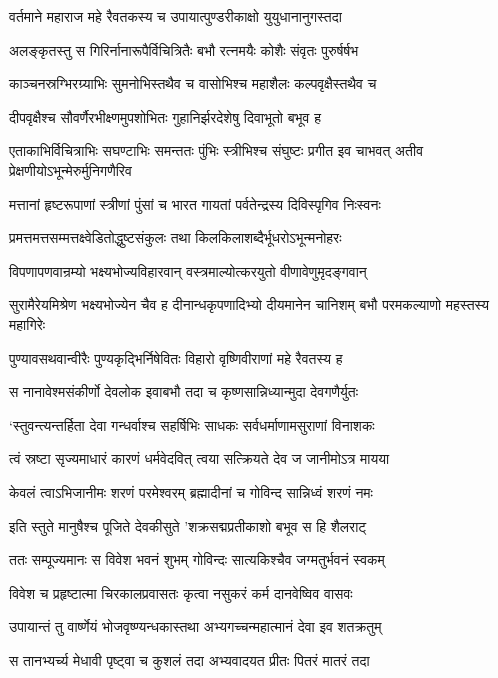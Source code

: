 \twolineshloka
{वर्तमाने महाराज महे रैवतकस्य च}
{उपायात्पुण्डरीकाक्षो युयुधानानुगस्तदा}


\twolineshloka
{अलङ्कृतस्तु स गिरिर्नानारूपैर्विचित्रितैः}
{बभौ रत्नमयैः कोशैः संवृतः पुरुर्षर्षभ}


\twolineshloka
{काञ्चनस्रग्भिरग्र्याभिः सुमनोभिस्तथैव च}
{वासोभिश्च महाशैलः कल्पवृक्षैस्तथैव च}


\twolineshloka
{दीपवृक्षैश्च सौवर्णैरभीक्ष्णमुपशोभितः}
{गुहानिर्झरदेशेषु दिवाभूतो बभूव ह}


\threelineshloka
{एताकाभिर्विचित्राभिः सघण्टाभिः समन्ततः}
{पुंभिः स्त्रीभिश्च संघुष्टः प्रगीत इव चाभवत्}
{अतीव प्रेक्षणीयोऽभून्मेरुर्मुनिगणैरिव}


\twolineshloka
{मत्तानां हृष्टरूपाणां स्त्रीणां पुंसां च भारत}
{गायतां पर्वतेन्द्रस्य दिविस्पृगिव निःस्वनः}


\twolineshloka
{प्रमत्तमत्तसम्मत्तक्ष्वेडितोद्धुष्टसंकुलः}
{तथा किलकिलाशब्दैर्भूधरोऽभून्मनोहरः}


\twolineshloka
{विपणापणवान्रम्यो भक्ष्यभोज्यविहारवान्}
{वस्त्रमाल्योत्करयुतो वीणावेणुमृदङ्गवान्}


\threelineshloka
{सुरामैरेयमिश्रेण भक्ष्यभोज्येन चैव ह}
{दीनान्धकृपणादिभ्यो दीयमानेन चानिशम्}
{बभौ परमकल्याणो महस्तस्य महागिरेः}


\twolineshloka
{पुण्यावसथवान्वीरैः पुण्यकृद्भिर्निषेवितः}
{विहारो वृष्णिवीराणां महे रैवतस्य ह}


\twolineshloka
{स नानावेश्मसंकीर्णो देवलोक इवाबभौ}
{तदा च कृष्णसान्निध्यान्मुदा देवगणैर्युतः}


\twolineshloka
{`स्तुवन्त्यन्तर्हिता देवा गन्धर्वाश्च सहर्षिभिः}
{साधकः सर्वधर्माणामसुराणां विनाशकः}


\twolineshloka
{त्वं स्रष्टा सृज्यमाधारं कारणं धर्मवेदवित्}
{त्वया सत्क्रियते देव ज जानीमोऽत्र मायया}


\twolineshloka
{केवलं त्वाऽभिजानीमः शरणं परमेश्वरम्}
{ब्रह्मादीनां च गोविन्द सान्निध्वं शरणं नमः}


\twolineshloka
{इति स्तुते मानुषैश्च पूजिते देवकीसुते}
{'शक्रसद्मप्रतीकाशो बभूव स हि शैलराट्}


\twolineshloka
{ततः सम्पूज्यमानः स विवेश भवनं शुभम्}
{गोविन्दः सात्यकिश्चैव जग्मतुर्भवनं स्वकम्}


\twolineshloka
{विवेश च प्रहृष्टात्मा चिरकालप्रवासतः}
{कृत्वा नसुकरं कर्म दानवेष्विव वासवः}


\twolineshloka
{उपायान्तं तु वार्ष्णेयं भोजवृष्ण्यन्धकास्तथा}
{अभ्यगच्चन्महात्मानं देवा इव शतक्रतुम्}


\twolineshloka
{स तानभ्यर्च्य मेधावी पृष्ट्वा च कुशलं तदा}
{अभ्यवादयत प्रीतः पितरं मातरं तदा}


